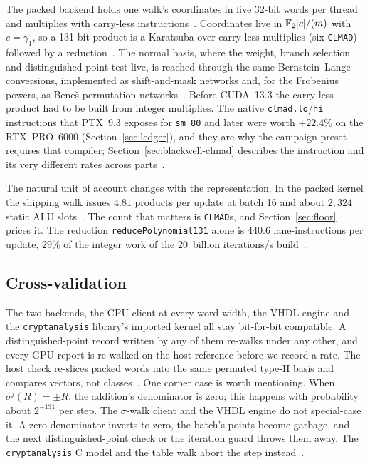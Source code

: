 The packed backend holds one walk's coordinates in five 32-bit words
per thread and multiplies with carry-less
instructions~. Coordinates live in
$\mathbb{F}_2[c]/(m)$ with $c=\gamma_1$, so a 131-bit product is a Karatsuba
over carry-less multiplies (six \texttt{CLMAD}) followed by a
reduction~. The normal basis,
where the weight, branch selection and distinguished-point test live,
is reached through the same Bernstein--Lange conversions, implemented
as shift-and-mask networks and, for the Frobenius powers, as
Bene\v{s} permutation networks~.
Before CUDA~13.3 the carry-less product had to be built from integer
multiplies. The native \texttt{clmad.lo}/\texttt{hi} instructions that
PTX~9.3 exposes for \texttt{sm\_80} and later were worth $+22.4\%$ on
the RTX~PRO~6000 (Section~\ref{sec:ledger}), and they are why the
campaign preset requires that compiler;
Section~\ref{sec:blackwell-clmad} describes the instruction and its
very different rates across parts~.

The natural unit of account changes with the representation. In the
packed kernel the shipping walk issues $4.81$ products per update at
batch 16 and about $2{,}324$ static ALU
slots~. The count that
matters is \texttt{CLMAD}s, and Section~\ref{sec:floor} prices it.
The reduction \texttt{reducePolynomial131} alone is $440.6$
lane-instructions per update, $29\%$ of the integer work of the
$20$~billion iterations/s build~.



\subsection{Cross-validation}
\label{sec:arith-compat}

The two backends, the CPU client at every word width, the VHDL engine
and the \texttt{cryptanalysis} library's imported kernel all stay bit-for-bit
compatible. A distinguished-point record written by any of them
re-walks under any other, and every GPU report is re-walked on the
host reference before we record a rate. The host check re-slices
packed words into the same permuted type-II basis and compares
vectors, not classes~. One
corner case is worth mentioning. When $\sigma^j(R)=\pm R$, the
addition's denominator is zero; this happens with probability about
$2^{-131}$ per step. The $\sigma$-walk client and the VHDL engine do
not special-case it. A zero denominator inverts to zero, the batch's
points become garbage, and the next distinguished-point check or the
iteration guard throws them away. The \texttt{cryptanalysis} C model and the table
walk abort the step instead~.
